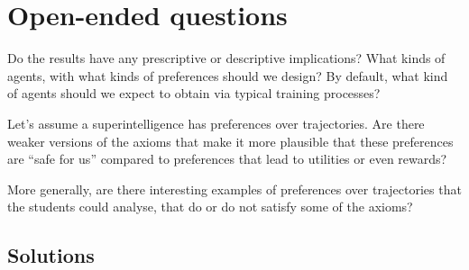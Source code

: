 \documentclass[11pt]{article}
\begin{document}
\section*{Open-ended questions}

\begin{exercise}
\label{ex:open-implications}
Do the results have any prescriptive or descriptive implications? What kinds of agents, with what kinds of preferences should we design? By default, what kind of agents should we expect to obtain via typical training processes?
\end{exercise}

\begin{exercise}
\label{ex:open-weaker-axioms}
Let's assume a superintelligence has preferences over trajectories. Are there weaker versions of the axioms that make it more plausible that these preferences are ``safe for us'' compared to preferences that lead to utilities or even rewards?
\end{exercise}

\begin{exercise}
\label{ex:open-examples}
More generally, are there interesting examples of preferences over trajectories that the students could analyse, that do or do not satisfy some of the axioms?
\end{exercise}


\begin{pdfonly}
\begin{solutionsonly}
\clearpage
\appendix
\section{Solutions}
\label{apx:solutions}
\end{solutionsonly}
\end{pdfonly}
\end{document}
